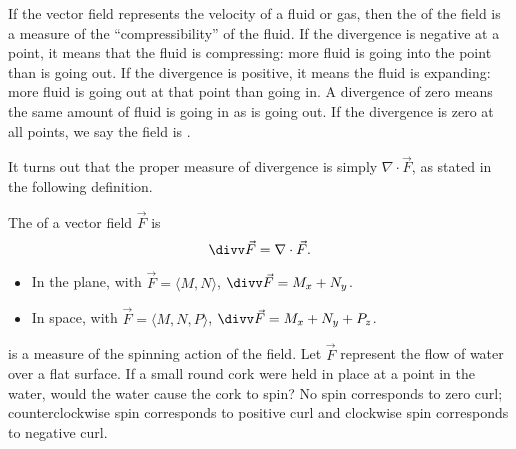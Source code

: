 If the vector field represents the velocity of a fluid or gas, then the  of the field is a measure of the ``compressibility'' of the fluid. If the divergence is negative at a point, it means that the fluid is compressing: more fluid is going into the point than is going out. If the divergence is positive, it means the fluid is expanding: more fluid is going out at that point than going in. A divergence of zero means the same amount of fluid is going in as is going out. If the divergence is zero at all points, we say the field is .

It turns out that the proper measure of divergence is simply $\nabla \cdot \vec F$, as stated in the following definition.

{The  of a vector field $\vec F$ is
$$\divv \vec F = \nabla \cdot \vec F.$$
\begin{itemize}
	\item In the plane, with $\vec F = \langle M,N\rangle$, $\divv \vec F = M_x+N_y$.
	\item	In space, with $\vec F = \langle M,N,P\rangle$, $\divv \vec F = M_x+N_y+P_z$.
\end{itemize}
}


 is a measure of the spinning action of the field. Let $\vec F$ represent the flow of water over a flat surface. If a small round cork were held in place at a point in the water, would the water cause the cork to spin? No spin corresponds to zero curl; counterclockwise spin corresponds to positive curl and clockwise spin corresponds to negative curl. 


